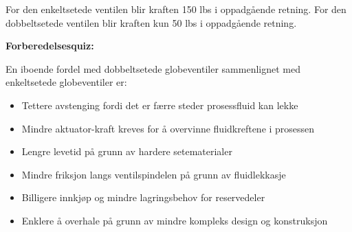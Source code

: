 





For den enkeltsetede ventilen blir kraften 150 lbs i oppadgående retning. For den dobbeltsetede ventilen blir kraften kun 50 lbs i oppadgående retning.

\vfil \eject

\noindent
{\bf Forberedelsesquiz:}

En iboende fordel med dobbeltsetede globeventiler sammenlignet med enkeltsetede globeventiler er:

\begin{itemize}
\item{} Tettere avstenging fordi det er færre steder prosessfluid kan lekke
\vskip 5pt
\item{} Mindre aktuator-kraft kreves for å overvinne fluidkreftene i prosessen
\vskip 5pt
\item{} Lengre levetid på grunn av hardere setematerialer
\vskip 5pt
\item{} Mindre friksjon langs ventilspindelen på grunn av fluidlekkasje
\vskip 5pt
\item{} Billigere innkjøp og mindre lagringsbehov for reservedeler
\vskip 5pt
\item{} Enklere å overhale på grunn av mindre kompleks design og konstruksjon
\end{itemize}




